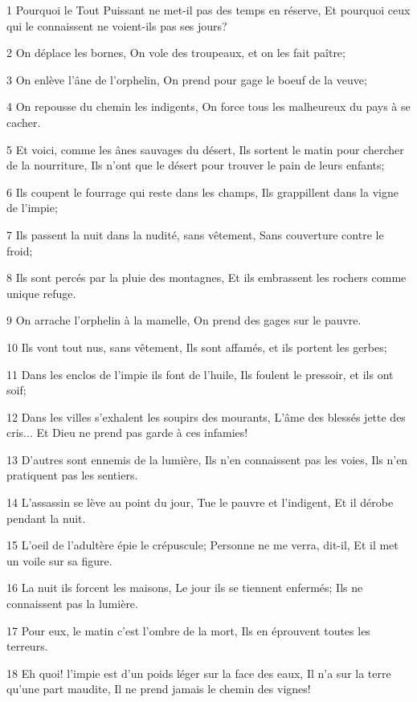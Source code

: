 \par 1 Pourquoi le Tout Puissant ne met-il pas des temps en réserve, Et pourquoi ceux qui le connaissent ne voient-ils pas ses jours?
\par 2 On déplace les bornes, On vole des troupeaux, et on les fait paître;
\par 3 On enlève l'âne de l'orphelin, On prend pour gage le boeuf de la veuve;
\par 4 On repousse du chemin les indigents, On force tous les malheureux du pays à se cacher.
\par 5 Et voici, comme les ânes sauvages du désert, Ils sortent le matin pour chercher de la nourriture, Ils n'ont que le désert pour trouver le pain de leurs enfants;
\par 6 Ils coupent le fourrage qui reste dans les champs, Ils grappillent dans la vigne de l'impie;
\par 7 Ils passent la nuit dans la nudité, sans vêtement, Sans couverture contre le froid;
\par 8 Ils sont percés par la pluie des montagnes, Et ils embrassent les rochers comme unique refuge.
\par 9 On arrache l'orphelin à la mamelle, On prend des gages sur le pauvre.
\par 10 Ils vont tout nus, sans vêtement, Ils sont affamés, et ils portent les gerbes;
\par 11 Dans les enclos de l'impie ils font de l'huile, Ils foulent le pressoir, et ils ont soif;
\par 12 Dans les villes s'exhalent les soupirs des mourants, L'âme des blessés jette des cris... Et Dieu ne prend pas garde à ces infamies!
\par 13 D'autres sont ennemis de la lumière, Ils n'en connaissent pas les voies, Ils n'en pratiquent pas les sentiers.
\par 14 L'assassin se lève au point du jour, Tue le pauvre et l'indigent, Et il dérobe pendant la nuit.
\par 15 L'oeil de l'adultère épie le crépuscule; Personne ne me verra, dit-il, Et il met un voile sur sa figure.
\par 16 La nuit ils forcent les maisons, Le jour ils se tiennent enfermés; Ils ne connaissent pas la lumière.
\par 17 Pour eux, le matin c'est l'ombre de la mort, Ils en éprouvent toutes les terreurs.
\par 18 Eh quoi! l'impie est d'un poids léger sur la face des eaux, Il n'a sur la terre qu'une part maudite, Il ne prend jamais le chemin des vignes!
